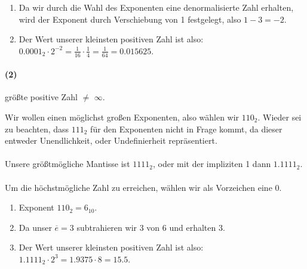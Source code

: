 \documentclass[12pt, letterpaper]{article}
\begin{document}
\begin{enumerate} 
    \item Da wir durch die Wahl des Exponenten eine denormalisierte Zahl erhalten, wird der Exponent durch Verschiebung von 1 festgelegt, also $1 - 3 = -2$.
    \item Der Wert unserer kleinsten positiven Zahl ist also: $0.0001_2 \cdot 2^{-2} = \frac{1}{16} \cdot \frac{1}{4} = \frac{1}{64} = 0.015625$. 
\end{enumerate}

\paragraph{(2)} größte positive Zahl $\neq$ $\infty$.\newline

\noindent Wir wollen einen möglichst großen Exponenten, also wählen wir $110_2$. Wieder sei zu beachten, dass $111_2$ für den Exponenten nicht in Frage kommt, da dieser entweder Unendlichkeit, oder Undefinierheit repräsentiert.\\ \\
\noindent Unsere größtmögliche Mantisse ist $1111_2$, oder mit der impliziten 1 dann $1.1111_2$.\\ \\
\noindent Um die höchstmögliche Zahl zu erreichen, wählen wir als Vorzeichen eine 0.

\begin{enumerate} 
    \item Exponent $110_2 = 6_{10}$.
    \item Da unser $\overline{e} = 3$ subtrahieren wir 3 von 6 und erhalten 3.
    \item Der Wert unserer kleinsten positiven Zahl ist also: $1.1111_2 \cdot 2^{3} = 1.9375 \cdot 8 = 15.5$. 
\end{enumerate}
\end{document}
